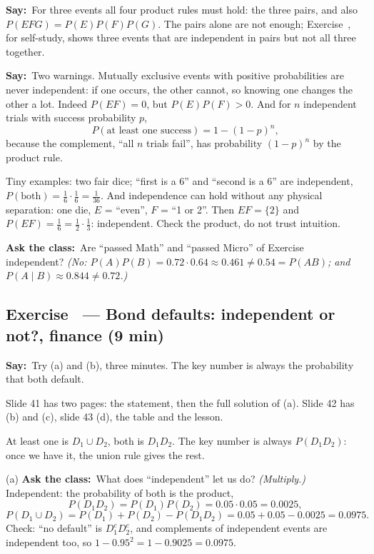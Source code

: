 \documentclass[11pt,a4paper,parskip=half]{scrartcl}
\newcommand{\say}{\textbf{\color{teal}Say:}\ }
\newcommand{\ask}{\textbf{\color{navy}Ask the class:}\ }
\begin{document}
\say For three events all four product rules must hold: the three pairs,
and also $P(EFG)=P(E)P(F)P(G)$. The pairs alone are not enough;
Exercise~, for self-study, shows three events
that are independent in pairs but not all three together.

\say Two warnings. Mutually exclusive events with positive probabilities
are never independent: if one occurs, the other cannot, so knowing one
changes the other a lot. Indeed $P(EF)=0$, but $P(E)P(F)>0$. And for $n$
independent trials with success probability $p$,
\[ P(\text{at least one success})=1-(1-p)^n, \]
because the complement, ``all $n$ trials fail'', has probability
$(1-p)^n$ by the product rule.

Tiny examples: two fair dice; ``first is a 6'' and ``second is a 6'' are
independent, $P(\text{both})=\tfrac16\cdot\tfrac16=\tfrac1{36}$. And
independence can hold without any physical separation: one die, $E$ =
``even'', $F$ = ``1 or 2''. Then $EF=\{2\}$ and
$P(EF)=\tfrac16=\tfrac12\cdot\tfrac13$: independent. Check the product,
do not trust intuition.

\ask Are ``passed Math'' and ``passed Micro'' of
Exercise~ independent? \emph{(No:
$P(A)P(B)=0.72\cdot0.64\approx0.461\ne0.54=P(AB)$; and
$P(A\mid B)\approx0.844\ne0.72$.)}

\subsection{Exercise~ --- Bond defaults: independent or not?, finance (9 min)}


\say Try (a) and (b), three minutes. The key number is always the
probability that both default.

\begin{slidecue}
	Slide 41 has two pages: the statement, then the full solution of (a).
	Slide 42 has (b) and (c), slide 43 (d), the table and the lesson.
\end{slidecue}

At least one is $D_1\cup D_2$, both is $D_1D_2$. The key number is always
$P(D_1D_2)$: once we have it, the union rule gives the rest.

(a) \ask What does ``independent'' let us do? \emph{(Multiply.)}
Independent: the probability of both is the product,
\[ P(D_1D_2)=P(D_1)P(D_2)=0.05\cdot0.05=0.0025, \]
\[ P(D_1\cup D_2)=P(D_1)+P(D_2)-P(D_1D_2)=0.05+0.05-0.0025=0.0975. \]
Check: ``no default'' is $D_1^cD_2^c$, and complements of independent
events are independent too, so $1-0.95^2=1-0.9025=0.0975$.
\end{document}
